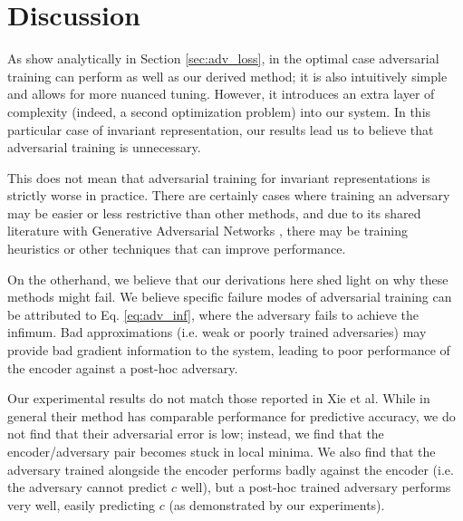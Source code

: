 
\section{Discussion}

As show analytically in Section \ref{sec:adv_loss}, in the optimal case adversarial training can perform as well as our derived method; it is also intuitively simple and allows for more nuanced tuning. However, it introduces an extra layer of complexity (indeed, a second optimization problem) into our system. In this particular case of invariant representation, our results lead us to believe that adversarial training is unnecessary.

This does not mean that adversarial training for invariant representations is strictly worse in practice. There are certainly cases where training an adversary may be easier or less restrictive than other methods, and due to its shared literature with Generative Adversarial Networks \cite{goodfellow2014generative}, there may be training heuristics or other techniques that can improve performance.

On the otherhand, we believe that our derivations here shed light on why these methods might fail. We believe specific failure modes of adversarial training can be attributed to Eq. \ref{eq:adv_inf}, where the adversary fails to achieve the infimum. Bad approximations (i.e. weak or poorly trained adversaries) may provide bad gradient information to the system, leading to poor performance of the encoder against a post-hoc adversary.


Our experimental results do not match those reported in Xie et al. While in general their method has comparable performance for predictive accuracy, we do not find that their adversarial error is low; instead, we find that the encoder/adversary pair becomes stuck in local minima.
We also find that the adversary trained alongside the encoder performs badly against the encoder (i.e. the adversary cannot predict $c$ well), but a post-hoc trained adversary performs very well, easily predicting $c$ (as demonstrated by our experiments).

